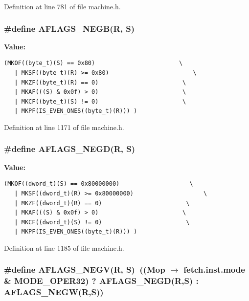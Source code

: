 Definition at line 781 of file machine.h.
\subsubsection[{AFLAGS\_\-NEGB}]{\setlength{\rightskip}{0pt plus 5cm}\#define AFLAGS\_\-NEGB(R, \/  S)}\label{machine_8h_a9715d3d2bd5d40cea771858e87277c4}


\textbf{Value:}

\begin{Code}\begin{verbatim}(MKOF((byte_t)(S) == 0x80)                        \
   | MKSF((byte_t)(R) >= 0x80)                        \
   | MKZF((byte_t)(R) == 0)                        \
   | MKAF(((S) & 0x0f) > 0)                        \
   | MKCF((byte_t)(S) != 0)                        \
   | MKPF(IS_EVEN_ONES((byte_t)(R))) )
\end{verbatim}
\end{Code}


Definition at line 1171 of file machine.h.
\subsubsection[{AFLAGS\_\-NEGD}]{\setlength{\rightskip}{0pt plus 5cm}\#define AFLAGS\_\-NEGD(R, \/  S)}\label{machine_8h_93ad552fa6947ba926cf6b4f901724b1}


\textbf{Value:}

\begin{Code}\begin{verbatim}(MKOF((dword_t)(S) == 0x80000000)                    \
   | MKSF((dword_t)(R) >= 0x80000000)                    \
   | MKZF((dword_t)(R) == 0)                        \
   | MKAF(((S) & 0x0f) > 0)                        \
   | MKCF((dword_t)(S) != 0)                        \
   | MKPF(IS_EVEN_ONES((byte_t)(R))) )
\end{verbatim}
\end{Code}


Definition at line 1185 of file machine.h.
\subsubsection[{AFLAGS\_\-NEGV}]{\setlength{\rightskip}{0pt plus 5cm}\#define AFLAGS\_\-NEGV(R, \/  S)~((Mop $\rightarrow$ fetch.inst.mode \& MODE\_\-OPER32) ? AFLAGS\_\-NEGD(R,S) : AFLAGS\_\-NEGW(R,S))}\label{machine_8h_dd89b22f41c0ea5e8f58bbacb585eec8}




